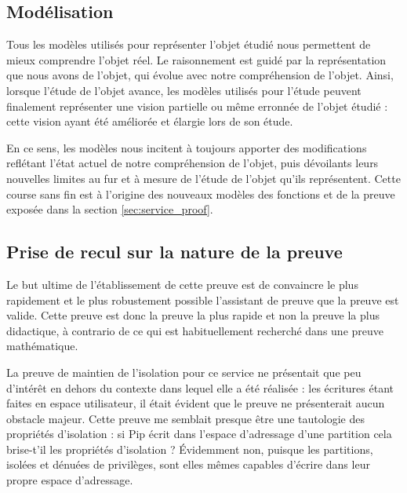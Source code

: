 		\subsection{Modélisation}

		Tous les modèles utilisés pour représenter l'objet étudié nous permettent de mieux comprendre l'objet réel. Le raisonnement est guidé par la représentation que nous avons de l'objet, qui évolue avec notre compréhension de l'objet. Ainsi, lorsque l'étude de l'objet avance, les modèles utilisés pour l'étude peuvent finalement représenter une vision partielle ou même erronnée de l'objet étudié : cette vision ayant été améliorée et élargie lors de son étude.

	En ce sens, les modèles nous incitent à toujours apporter des modifications reflétant l'état actuel de notre compréhension de l'objet, puis dévoilants leurs nouvelles limites au fur et à mesure de l'étude de l'objet qu'ils représentent. Cette course sans fin est à l'origine des nouveaux modèles des fonctions et de la preuve exposée dans la section \ref{sec:service_proof}.


		\subsection{Prise de recul sur la nature de la preuve}

		\label{sec:proof_limits}

		Le but ultime de l'établissement de cette preuve est de convaincre le plus rapidement et le plus robustement possible l'assistant de preuve que la preuve est valide. Cette preuve est donc la preuve la plus rapide et non la preuve la plus didactique, à contrario de ce qui est habituellement recherché dans une preuve mathématique.

		La preuve de maintien de l'isolation pour ce service ne présentait que peu d'intérêt en dehors du contexte dans lequel elle a été réalisée : les écritures étant faites en espace utilisateur, il était évident que le preuve ne présenterait aucun obstacle majeur. Cette preuve me semblait presque être une tautologie des propriétés d'isolation : si Pip écrit dans l'espace d'adressage d'une partition cela brise-t'il les propriétés d'isolation ? Évidemment non, puisque les partitions, isolées et dénuées de privilèges, sont elles mêmes capables d'écrire dans leur propre espace d'adressage.

